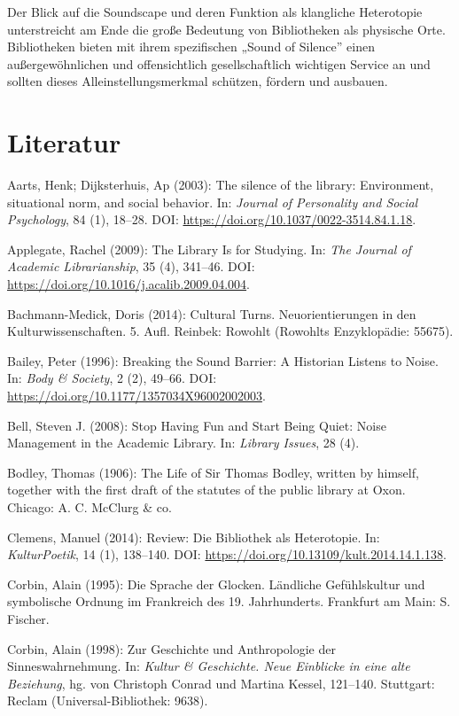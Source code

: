\documentclass[a4paper,
fontsize=11pt,
oneside,
numbers=noperiodatend,
parskip=half-,
bibliography=totoc,
final
]{scrartcl}
\begin{document}
Der Blick auf die Soundscape und deren Funktion als klangliche
Heterotopie unterstreicht am Ende die große Bedeutung von Bibliotheken
als physische Orte. Bibliotheken bieten mit ihrem spezifischen „Sound of
Silence'' einen außergewöhnlichen und offensichtlich gesellschaftlich
wichtigen Service an und sollten dieses Alleinstellungsmerkmal schützen,
fördern und ausbauen.

\hypertarget{literatur}{%
\section{Literatur}\label{literatur}}

Aarts, Henk; Dijksterhuis, Ap (2003): The silence of the library:
Environment, situational norm, and social behavior. In: \emph{Journal of
Personality and Social Psychology}, 84 (1), 18--28. DOI:
\url{https://doi.org/10.1037/0022-3514.84.1.18}.

Applegate, Rachel (2009): The Library Is for Studying. In: \emph{The
Journal of Academic Librarianship}, 35 (4), 341--46. DOI:
\url{https://doi.org/10.1016/j.acalib.2009.04.004}.

Bachmann-Medick, Doris (2014): Cultural Turns. Neuorientierungen in den
Kulturwissenschaften. 5. Aufl. Reinbek: Rowohlt (Rowohlts Enzyklopädie:
55675).

Bailey, Peter (1996): Breaking the Sound Barrier: A Historian Listens to
Noise. In: \emph{Body \& Society}, 2 (2), 49--66. DOI:
\url{https://doi.org/10.1177/1357034X96002002003}.

Bell, Steven J. (2008): Stop Having Fun and Start Being Quiet: Noise
Management in the Academic Library. In: \emph{Library Issues}, 28 (4).

Bodley, Thomas (1906): The Life of Sir Thomas Bodley, written by
himself, together with the first draft of the statutes of the public
library at Oxon. Chicago: A. C. McClurg \& co.

Clemens, Manuel (2014): Review: Die Bibliothek als Heterotopie. In:
\emph{KulturPoetik}, 14 (1), 138--140. DOI:
\url{https://doi.org/10.13109/kult.2014.14.1.138}.

Corbin, Alain (1995): Die Sprache der Glocken. Ländliche Gefühlskultur
und symbolische Ordnung im Frankreich des 19. Jahrhunderts. Frankfurt am
Main: S. Fischer.

Corbin, Alain (1998): Zur Geschichte und Anthropologie der
Sinneswahrnehmung. In: \emph{Kultur \& Geschichte. Neue Einblicke in
eine alte Beziehung}, hg. von Christoph Conrad und Martina Kessel,
121--140. Stuttgart: Reclam (Universal-Bibliothek: 9638).
\end{document}
